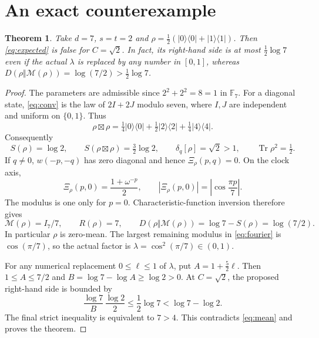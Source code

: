 \documentclass[10pt]{article}
\newtheorem{theorem}{Theorem}
\newcommand{\Tr}{\operatorname{Tr}}
\newcommand{\MS}{\mathcal M}
\begin{document}
\section{An exact counterexample}

\begin{theorem}\label{thm:counterexample}
Take $d=7$, $s=t=2$ and
$\rho=\tfrac12(|0\rangle\langle0|+|1\rangle\langle1|)$.
Then \eqref{eq:expected} is false for $C=\sqrt2$.
In fact, its right-hand side is at most $\tfrac12\log7$ even if the actual
$\lambda$ is replaced by any number in $[0,1]$, whereas
$D(\rho\Vert\MS(\rho))=\log(7/2)>\tfrac12\log7$.
\end{theorem}

\begin{proof}
The parameters are admissible since $2^2+2^2=8=1$ in $\mathbb F_7$.
For a diagonal state, \eqref{eq:conv} is the law of $2I+2J$ modulo seven,
where $I,J$ are independent and uniform on $\{0,1\}$. Thus
\begin{equation}\label{eq:output}
 \rho\boxtimes\rho
 =\tfrac14|0\rangle\langle0|+\tfrac12|2\rangle\langle2|
   +\tfrac14|4\rangle\langle4|.
\end{equation}
Consequently
\begin{equation}\label{eq:entropies}
 S(\rho)=\log2,\qquad S(\rho\boxtimes\rho)=\tfrac32\log2,
 \qquad \delta_q[\rho]=\sqrt2>1,\qquad \Tr\rho^2=\tfrac12.
\end{equation}
If $q\ne0$, $w(-p,-q)$ has zero diagonal and hence
$\Xi_\rho(p,q)=0$. On the clock axis,
\begin{equation}\label{eq:fourier}
 \Xi_\rho(p,0)=\frac{1+\omega^{-p}}2,\qquad
 |\Xi_\rho(p,0)|=\left|\cos\frac{\pi p}{7}\right|.
\end{equation}
The modulus is one only for $p=0$. Characteristic-function inversion therefore
gives
\begin{equation}\label{eq:mean}
 \MS(\rho)=I_7/7,\qquad R(\rho)=7,\qquad
 D(\rho\Vert\MS(\rho))=\log7-S(\rho)=\log(7/2).
\end{equation}
In particular $\rho$ is zero-mean. The largest remaining modulus in
\eqref{eq:fourier} is $\cos(\pi/7)$, so the actual factor is
$\lambda=\cos^2(\pi/7)\in(0,1)$.

For any numerical replacement $0\le\ell\le1$ of $\lambda$, put
$A=1+\tfrac52\ell$.
Then $1\le A\le7/2$ and
$B=\log7-\log A\ge\log2>0$.
At $C=\sqrt2$, the proposed right-hand side is bounded by
\[
 \frac{\log7}{B}\,\frac{\log2}{2}
 \le\frac12\log7
 <\log7-\log2.
\]
The final strict inequality is equivalent to $7>4$.
This contradicts \eqref{eq:mean} and proves the theorem.
\end{proof}
\end{document}
